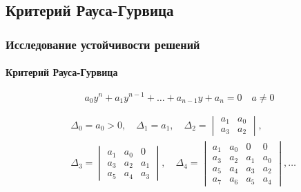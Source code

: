 \documentclass{beamer}
\numberwithin{equation}{section}
\begin{document}
    \subsection{Критерий Рауса-Гурвица}

    \begin{frame}
        \frametitle{Исследование устойчивости решений}
        \framesubtitle{Критерий Рауса-Гурвица}

        \begin{equation}
            a_0 y^n + a_1 y^{n-1} + \dots + a_{n-1} y + a_n = 0 \quad a \neq 0
        \end{equation}
    
        \begin{align*}
            & \Delta_0 = a_0 > 0, \quad \Delta_1 = a_1, \quad \Delta_2 = 
            \begin{vmatrix}
                a_1 & a_0\\
                a_3 & a_2
            \end{vmatrix},\\
            & \Delta_3 = 
            \begin{vmatrix}
                a_1 & a_0 & 0\\
                a_3 & a_2 &a_1\\
                a_5 & a_4 &a_3
            \end{vmatrix}, \quad \Delta_4 =
            \begin{vmatrix}
                a_1 & a_0 & 0 & 0\\
                a_3 & a_2 & a_1 & a_0\\
                a_5 & a_4 & a_3 & a_2\\
                a_7 & a_6 & a_5 & a_4
            \end{vmatrix}, \dots
        \end{align*}
    \end{frame}
\end{document}
